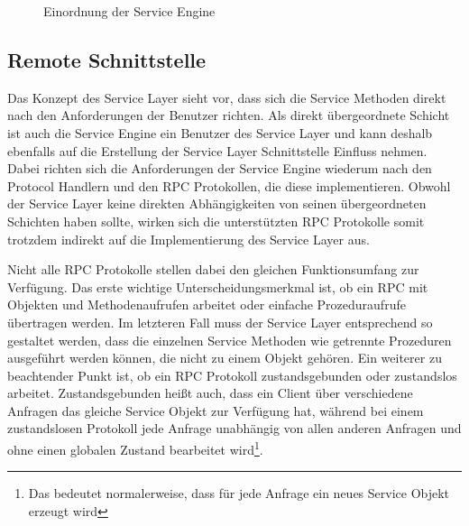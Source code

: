 \begin{figure}[bth]
	\caption{Einordnung der Service Engine}
	\label{ill:serviceengine}
\end{figure}

\subsection{Remote Schnittstelle}
Das Konzept des Service Layer sieht vor, dass sich die Service Methoden direkt
nach den Anforderungen der Benutzer richten. Als direkt übergeordnete Schicht ist
auch die Service Engine ein Benutzer des Service Layer und kann deshalb ebenfalls
auf die Erstellung der Service Layer Schnittstelle Einfluss nehmen. Dabei
richten sich die Anforderungen der Service Engine wiederum nach den Protocol
Handlern und den \ac{RPC} Protokollen, die diese implementieren. Obwohl der
Service Layer keine direkten Abhängigkeiten von seinen übergeordneten Schichten
haben sollte, wirken sich die unterstützten \ac{RPC} Protokolle somit trotzdem
indirekt auf die Implementierung des Service Layer aus.

Nicht alle \ac{RPC} Protokolle stellen dabei den gleichen Funktionsumfang zur
Verfügung. Das erste wichtige Unterscheidungsmerkmal ist, ob ein \ac{RPC} mit
Objekten und Methodenaufrufen arbeitet oder einfache Prozeduraufrufe übertragen
werden. Im letzteren Fall muss der Service Layer entsprechend so gestaltet
werden, dass die einzelnen Service Methoden wie getrennte Prozeduren ausgeführt werden
können, die nicht zu einem Objekt gehören. Ein weiterer zu beachtender Punkt ist,
ob ein \ac{RPC} Protokoll zustandsgebunden oder zustandslos arbeitet.
Zustandsgebunden heißt auch, dass ein Client über verschiedene Anfragen das
gleiche Service Objekt zur Verfügung hat, während bei einem zustandslosen Protokoll jede
Anfrage unabhängig von allen anderen Anfragen und ohne einen globalen Zustand
bearbeitet wird\footnote{Das bedeutet normalerweise, dass für jede Anfrage ein
neues Service Objekt erzeugt wird}.

